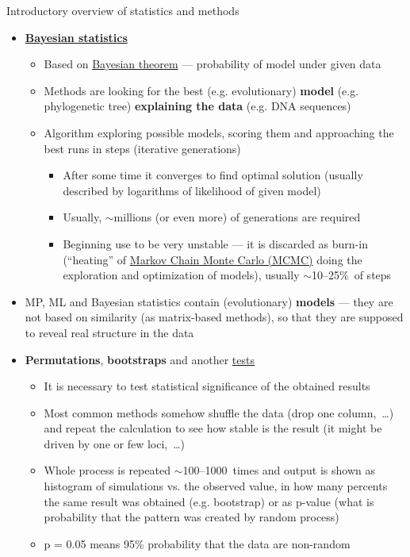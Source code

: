 \documentclass[compress, ucs, xelatex, 11pt, xcolor=svgnames,
	hyperref={
		bookmarks=true,
		unicode=true,
		colorlinks=true,
		pdftitle={Molecular data in R},
		plainpages=false,
		pdfauthor={Vojtech Zeisek},
		pdfsubject={Course about phylogeny and evolution in R},
		pdfcreator={XeLaTeX},
		pdfkeywords={R, evolution, phylogeny, molecular data},
		linkcolor=Tomato,
		anchorcolor=SaddleBrown,
		citecolor=Goldenrod,
		filecolor=DarkMagenta,
		menucolor=Sienna,
		urlcolor=DarkTurquoise,
		pdftex},
	url={hyphens, lowtilde} %
	]{beamer}
\begin{document}
\begin{frame}[allowframebreaks]{Introductory overview of statistics and methods}
\begin{itemize}
\begin{itemize}
		\end{itemize}
		\item \textbf{\href{https://en.wikipedia.org/wiki/Bayesian_statistics}{Bayesian statistics}}
		\begin{itemize}
			\item Based on \href{https://en.wikipedia.org/wiki/Bayes_theorem}{Bayesian theorem} --- probability of model under given data
			\item Methods are looking for the best (e.g. evolutionary) \textbf{model} (e.g. phylogenetic tree) \textbf{explaining the data} (e.g. DNA sequences)
			\item Algorithm exploring possible models, scoring them and approaching the best runs in steps (iterative generations)
			\begin{itemize}
				\item After some time it converges to find optimal solution (usually described by logarithms of likelihood of given model)
				\item Usually, $\sim$millions (or even more) of generations are required
				\item Beginning use to be very unstable --- it is discarded as burn-in (``heating'' of \href{https://en.wikipedia.org/wiki/Markov_chain_Monte_Carlo}{Markov Chain Monte Carlo (MCMC)} doing the exploration and optimization of models), usually $\sim$10--25\%~of steps
			\end{itemize}
		\end{itemize}
		\item MP, ML and Bayesian statistics contain (evolutionary) \textbf{models} --- they are not based on similarity (as matrix-based methods), so that they are supposed to reveal real structure in the data
		\item \textbf{Permutations}, \textbf{bootstraps} and another \href{https://en.wikipedia.org/wiki/Resampling_(statistics)}{tests}
		\begin{itemize}
			\item It is necessary to test statistical significance of the obtained results
			\item Most common methods somehow shuffle the data (drop one column,~\ldots) and repeat the calculation to see how stable is the result (it might be driven by one or few loci,~\ldots)
			\item Whole process is repeated $\sim$100--1000~times and output is shown as histogram of simulations vs. the observed value, in how many percents the same result was obtained (e.g. bootstrap) or as p-value (what is probability that the pattern was created by random process)
			\item p = 0.05 means 95\% probability that the data are non-random
		\end{itemize}
	\end{itemize}
\end{frame}
\end{document}
